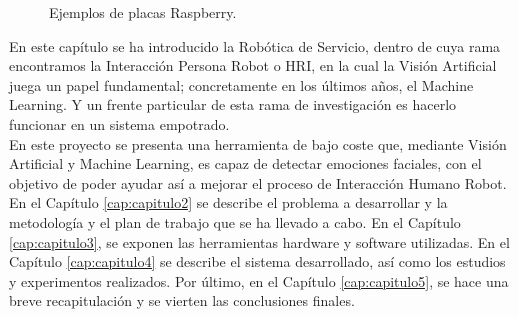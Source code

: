 \begin{figure}[h!]
  \begin{center}
    \subcapcentertrue
    \hspace{1cm}
  \end{center}
\caption{Ejemplos de placas Raspberry.}
\label{fig:raspberry_ejemplos}
\end{figure}

En este capítulo se ha introducido la Robótica de Servicio, dentro de cuya rama encontramos la Interacción Persona Robot o HRI, en la cual la Visión Artificial juega un papel fundamental; concretamente en los últimos años, el Machine Learning. Y un frente particular de esta rama de investigación es hacerlo funcionar en un sistema empotrado.\\

En este proyecto se presenta una herramienta de bajo coste que, mediante Visión Artificial y Machine Learning, es capaz de detectar emociones faciales, con el objetivo de poder ayudar así a mejorar el proceso de Interacción Humano Robot. En el Capítulo \ref{cap:capitulo2} se describe el problema a desarrollar y la metodología y el plan de trabajo que se ha llevado a cabo. En el Capítulo \ref{cap:capitulo3}, se exponen las herramientas hardware y software utilizadas. En el Capítulo \ref{cap:capitulo4} se describe el sistema desarrollado, así como los estudios y experimentos realizados. Por último, en el Capítulo \ref{cap:capitulo5}, se hace una breve recapitulación y se vierten las conclusiones finales.





